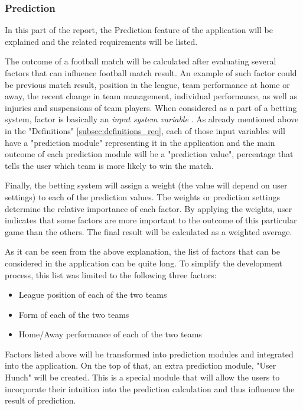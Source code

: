 \subsubsection{Prediction}
\label{subsubsec:prediction_req}
In this part of the report, the Prediction feature of the application will be explained and the related requirements will be listed.

The outcome of a football match will be calculated after evaluating several factors that can influence football match result. An example of such factor could be previous match result, position in the league, team performance at home or away, the recent change in team management, individual performance, as well as injuries and suspensions of team players. When considered as a part of a betting system, factor is basically an \emph{input system variable} \cite{art:simplebettingsystem}. As already mentioned above in the "Definitions" \ref{subsec:definitions_req}, each of those input variables will have a "prediction module" representing it in the application and the main outcome of each prediction module will be a "prediction value", percentage that tells the user which team is more likely to win the match.

Finally, the betting system will assign a weight (the value will depend on user settings) to each of the prediction values. The weights or prediction settings determine the relative importance of each factor. By applying the weights, user indicates that some factors are more important to the outcome of this particular game than the others. The final result will be calculated as a weighted average.

As it can be seen from the above explanation, the list of factors that can be considered in the application can be quite long. To simplify the development process, this list was limited to the following three factors:
\begin{itemize}
	\item League position of each of the two teams
	\item Form of each of the two teams
	\item Home/Away performance of each of the two teams
\end{itemize}

Factors listed above will be transformed into prediction modules and integrated into the application. On the top of that, an extra prediction module, "User Hunch" will be created. This is a special module that will allow the users to incorporate their intuition into the prediction calculation and thus influence the result of prediction.

